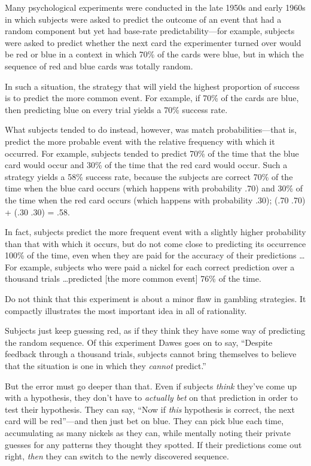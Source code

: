 {
 Many psychological experiments were conducted in the late 1950s
and early 1960s in which subjects were asked to predict the outcome of
an event that had a random component but yet had base-rate
predictability---for example, subjects were asked to predict whether
the next card the experimenter turned over would be red or blue in a
context in which 70\% of the cards were blue, but in which the sequence
of red and blue cards was totally random.}

{
 In such a situation, the strategy that will yield the highest
proportion of success is to predict the more common event. For example,
if 70\% of the cards are blue, then predicting blue on every trial
yields a 70\% success rate.}

{
 What subjects tended to do instead, however, was match
probabilities---that is, predict the more probable event with the
relative frequency with which it occurred. For example, subjects tended
to predict 70\% of the time that the blue card would occur and 30\% of
the time that the red card would occur. Such a strategy yields a 58\%
success rate, because the subjects are correct 70\% of the time when
the blue card occurs (which happens with probability .70) and 30\% of
the time when the red card occurs (which happens with probability .30);
(.70 {\texttimes} .70) + (.30 {\texttimes} .30) = .58.}

{
 In fact, subjects predict the more frequent event with a slightly
higher probability than that with which it occurs, but do not come
close to predicting its occurrence 100\% of the time, even when they
are paid for the accuracy of their predictions \ldots For example,
subjects who were paid a nickel for each correct prediction over a
thousand trials \ldots predicted [the more common event] 76\% of the
time.}

{
 Do not think that this experiment is about a minor flaw in
gambling strategies. It compactly illustrates the most important idea
in all of rationality.}

{
 Subjects just keep guessing red, as if they think they have some
way of predicting the random sequence. Of this experiment Dawes goes on
to say, ``Despite feedback through a thousand trials,
subjects cannot bring themselves to believe that the situation is one
in which they \textit{cannot} predict.''}

{
 But the error must go deeper than that. Even if subjects
\textit{think} they've come up with a hypothesis, they
don't have to \textit{actually bet} on that prediction
in order to test their hypothesis. They can say, ``Now
if \textit{this} hypothesis is correct, the next card will be
red''---and then just bet on blue. They can pick blue
each time, accumulating as many nickels as they can, while mentally
noting their private guesses for any patterns they thought they
spotted. If their predictions come out right, \textit{then} they can
switch to the newly discovered sequence.}

